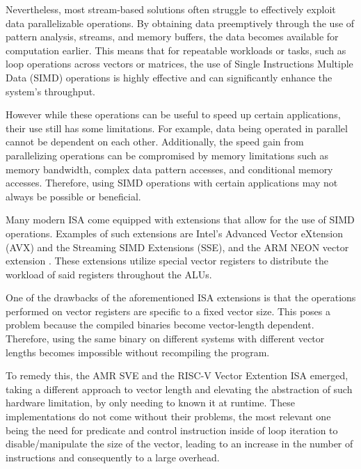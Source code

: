 %    
%    
%    
%   


Nevertheless, most stream-based solutions often struggle to effectively exploit data parallelizable operations. By obtaining data preemptively through the use of pattern analysis, streams, and memory buffers, the data becomes available for computation earlier. This means that for repeatable workloads or tasks, such as loop operations across vectors or matrices, the use of Single Instructions Multiple Data (\acrshort{SIMD}) operations is highly effective and can significantly enhance the system's throughput.

However while these operations can be useful to speed up certain applications, their use still has some limitations. For example, data being operated in parallel cannot be dependent on each other. Additionally, the speed gain from parallelizing operations can be compromised by memory limitations such as memory bandwidth, complex data pattern accesses, and conditional memory accesses. Therefore, using SIMD operations with certain applications may not always be possible or beneficial.

Many modern \acrfull{ISA} come equipped with extensions that allow for the use of \acrfull{SIMD} operations. Examples of such extensions are Intel's Advanced Vector eXtension (AVX) and the Streaming SIMD Extensions (SSE), and the ARM NEON vector extension \cite{arm-neon}. These extensions utilize special vector registers to distribute the workload of said registers throughout the \acrshort{ALUs}.

One of the drawbacks of the aforementioned \acrshort{ISA} extensions is that the operations performed on vector registers are specific to a fixed vector size. This poses a problem because the compiled binaries become vector-length dependent. Therefore, using the same binary on different systems with different vector lengths becomes impossible without recompiling the program. 

To remedy this, the AMR SVE and the RISC-V Vector Extention \acrshort{ISA} emerged, taking a different approach to vector length and elevating the abstraction of such hardware limitation, by only needing to known it at runtime. These implementations do not come without their problems, the most relevant one being the need for predicate and control instruction inside of loop iteration to disable/manipulate the size of the vector, leading to an increase in the number of instructions and consequently to a large overhead.


